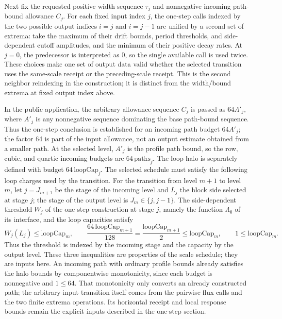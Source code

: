 Next fix the requested positive width sequence $\tau_j$ and nonnegative
incoming path-bound allowance $C_j$. For each fixed input index $j$, the
one-step calls indexed by the two possible output indices $i=j$ and
$i=j-1$ are unified by a second set of extrema: take the maximum of their
drift bounds, period thresholds, and side-dependent cutoff amplitudes, and
the minimum of their positive decay rates. At $j=0$, the predecessor is
interpreted as $0$, so the single available call is used twice. These choices
make one set of output data valid whether the selected transition uses the
same-scale receipt or the preceding-scale receipt. This is the second
neighbor reindexing in the construction; it is distinct from the
width/bound extrema at fixed output index above.

In the public application, the arbitrary allowance sequence $C_j$ is passed
as $64A'_j$, where $A'_j$ is any nonnegative sequence dominating the base
path-bound sequence. Thus the one-step conclusion is established for an
incoming path budget $64A'_j$; the factor 64 is part of the input allowance,
not an output estimate obtained from a smaller path. At the selected level,
$A'_j$ is the profile path bound, so the row, cubic, and quartic incoming
budgets are $64\,\mathrm{paths}_j$. The loop halo is separately defined with
budget $64\,\mathrm{loopCap}_j$. The selected schedule must satisfy the following
loop charges used by the transition. For the transition from level
$m+1$ to level $m$, let $j=J_{m+1}$ be the stage of the incoming level
and $L_j$ the block side selected at stage $j$; the stage of the output
level is $J_m\in\{j,j-1\}$. The side-dependent threshold $W_j$ of the
one-step construction at stage $j$, namely the function $\Lambda_0$ of
its interface, and the loop capacities satisfy
\[
 W_j(L_j)\leq\mathrm{loopCap}_m,\qquad
 \frac{64\,\mathrm{loopCap}_{m+1}}{128}
      =\frac{\mathrm{loopCap}_{m+1}}2
      \leq\mathrm{loopCap}_m,\qquad 1\le\mathrm{loopCap}_m .
\]
Thus the threshold is indexed by the incoming stage and the capacity by
the output level. These three inequalities are properties of the scale
schedule; they are inputs here. An
incoming path with ordinary profile bounds already satisfies the halo bounds
by componentwise monotonicity, since each budget is nonnegative and
$1\leq64$. That monotonicity only converts an already constructed path; the
arbitrary-input transition itself comes from the pairwise flux calls and the
two finite extrema operations. Its horizontal receipt and local response
bounds remain the explicit inputs described in the one-step section.

